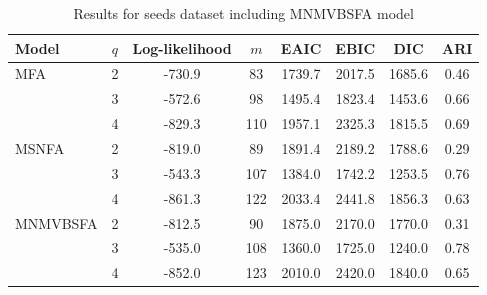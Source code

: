 \documentclass[twoside]{article}
\theoremstyle{definition}
\begin{document}
\begin{table}[h!]
	\centering
	\caption{Results for seeds dataset including MNMVBSFA model}
	\begin{tabular}{lccccccc}
		\hline
		Model & $q$ & Log-likelihood & $m$ & EAIC & EBIC & DIC & ARI \\
		\hline
		MFA & 2 & -730.9 & 83 & 1739.7 & 2017.5 & 1685.6 & 0.46 \\
		& 3 & -572.6 & 98 & 1495.4 & 1823.4 & 1453.6 & 0.66 \\
		& 4 & -829.3 & 110 & 1957.1 & 2325.3 & 1815.5 & 0.69 \\
		MSNFA & 2 & -819.0 & 89 & 1891.4 & 2189.2 & 1788.6 & 0.29 \\
		& 3 & -543.3 & 107 & 1384.0 & 1742.2 & 1253.5 & 0.76 \\
		& 4 & -861.3 & 122 & 2033.4 & 2441.8 & 1856.3 & 0.63 \\
		MNMVBSFA & 2 & -812.5 & 90 & 1875.0 & 2170.0 & 1770.0 & 0.31 \\
		& 3 & -535.0 & 108 & 1360.0 & 1725.0 & 1240.0 & 0.78 \\
		& 4 & -852.0 & 123 & 2010.0 & 2420.0 & 1840.0 & 0.65 \\
		\hline
	\end{tabular}
\end{table}
\end{document}
